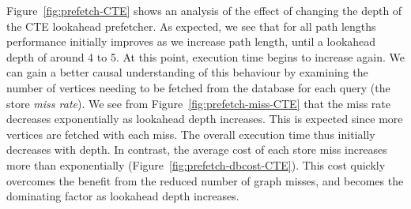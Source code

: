 Figure~\ref{fig:prefetch-CTE} shows an analysis of the effect of changing the
depth of the CTE lookahead prefetcher. As expected, we see that for all path
lengths performance initially improves as we increase path length, until a
lookahead depth of around 4 to 5. At this point, execution time begins to
increase again. We can gain a better causal understanding of this behaviour by examining  the number of vertices needing to be fetched from the
database for each query (the store \textit{miss rate}). We see from
Figure~\ref{fig:prefetch-miss-CTE} that the miss rate decreases exponentially
as lookahead depth increases. This is expected since more vertices are fetched
with each miss. The overall execution time thus initially decreases with
depth. In contrast, the average cost of each store miss increases more than
exponentially (Figure~\ref{fig:prefetch-dbcost-CTE}). This cost quickly
overcomes the benefit from the reduced number of graph misses, and becomes the
dominating factor as lookahead depth increases.

